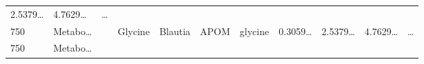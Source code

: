 \documentclass[
]{article}
\begin{document}
\begin{longtable}[]{@{}lllllllllll@{}}
\begin{minipage}[t]{0.07\columnwidth}
2.5379\ldots{}\strut
\end{minipage} & \begin{minipage}[t]{0.07\columnwidth}\raggedright
4.7629\ldots{}\strut
\end{minipage} & \begin{minipage}[t]{0.03\columnwidth}\raggedright
\ldots{}\strut
\end{minipage}\tabularnewline
\begin{minipage}[t]{0.03\columnwidth}\raggedright
750\strut
\end{minipage} & \begin{minipage}[t]{0.07\columnwidth}\raggedright
Metabo\ldots{}\strut
\end{minipage} & \begin{minipage}[t]{0.07\columnwidth}\raggedright
\strut
\end{minipage} & \begin{minipage}[t]{0.09\columnwidth}\raggedright
Glycine\strut
\end{minipage} & \begin{minipage}[t]{0.07\columnwidth}\raggedright
Blautia\strut
\end{minipage} & \begin{minipage}[t]{0.07\columnwidth}\raggedright
APOM\strut
\end{minipage} & \begin{minipage}[t]{0.09\columnwidth}\raggedright
glycine\strut
\end{minipage} & \begin{minipage}[t]{0.07\columnwidth}\raggedright
0.3059\ldots{}\strut
\end{minipage} & \begin{minipage}[t]{0.07\columnwidth}\raggedright
2.5379\ldots{}\strut
\end{minipage} & \begin{minipage}[t]{0.07\columnwidth}\raggedright
4.7629\ldots{}\strut
\end{minipage} & \begin{minipage}[t]{0.03\columnwidth}\raggedright
\ldots{}\strut
\end{minipage}\tabularnewline
\begin{minipage}[t]{0.03\columnwidth}\raggedright
750\strut
\end{minipage} & \begin{minipage}[t]{0.07\columnwidth}\raggedright
Metabo\ldots{}\strut
\end{minipage} & \begin{minipage}[t]{0.07\columnwidth}\raggedright

\end{minipage}
\end{longtable}
\end{document}
